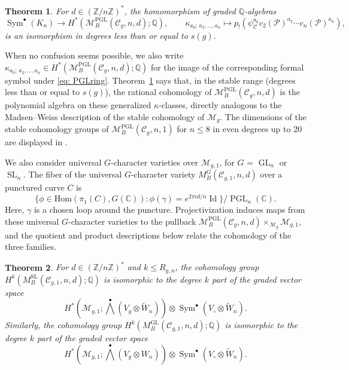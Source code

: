 \documentclass[11pt,reqno]{amsart}
\theoremstyle{plain} %
\newtheorem{theorem}{Theorem}[section]
\theoremstyle{definition}
\newcommand{\QQ}{\mathbb{Q}}
\newcommand{\CC}{\mathbb{C}}
\newcommand{\Hom}{\mathrm{Hom}}
\newcommand{\M}{\mathcal{M}}
\newcommand{\C}{\mathcal{C}}
\newcommand{\ZZ}{\mathbb{Z}}
\DeclareMathOperator{\Id}{Id}
\DeclareMathOperator{\GL}{GL}
\DeclareMathOperator{\SL}{SL}
\DeclareMathOperator{\PGL}{PGL}
\DeclareMathOperator{\Sym}{Sym}
\newcommand{\tW}{\widetilde{W}}
\begin{document}
\begin{theorem} \label{thm:stablePGL}
For $d \in (\ZZ/n\ZZ)^*$, the homomorphism of graded $\QQ$-algebras
\begin{equation}\label{eq: PGLring}
\Sym^\bullet (K_n) \longrightarrow H^*(\M_B^{\PGL}(\C_g, n,d); \QQ), \qquad \kappa_{a_0;\,a_2,\ldots,a_n} \longmapsto p_!\left(\psi_\C^{a_0}c_2(\mathcal P)^{a_2}\cdots c_n(\mathcal P)^{a_n}\right),
\end{equation}
is an isomorphism in degrees less than or equal to $s(g)$.
\end{theorem}


\noindent When no confusion seems possible, we also write $\kappa_{a_0;\,a_2,\ldots,a_n} \in H^*(\M_B^{\PGL}(\C_g, n,d); \QQ)$ for the image of the corresponding formal symbol under \eqref{eq: PGLring}. Theorem~\ref{thm:stablePGL} says that, in the stable range (degrees less than or equal to $s(g)$), the rational cohomology of $\M_B^{\PGL}(\C_g, n,d)$ is the polynomial algebra on these generalized $\kappa$-classes, directly analogous to the Madsen--Weiss description of the stable cohomology of $\M_g$. The dimensions of the stable cohomology groups of $\M_B^{\PGL}(\C_g, n, 1)$ for $n \leq 8$ in even degrees up to 20 are displayed in .



\medskip



We also consider universal $G$-character varieties over $\M_{g,1}$, for $G$ = $\GL_n$ or $\SL_n$.  The fiber of the universal $G$-character variety $M^{G}_B(\C_{g,1}, n, d)$ over a punctured curve $C$ is 
$$\{ \phi \in \Hom(\pi_1(C), G(\CC)): \phi(\gamma) = e^{2\pi i d/n} \Id\}/\PGL_n(\CC).$$
Here, $\gamma$ is a chosen loop around the puncture. Projectivization induces maps from these universal $G$-character varieties to the pullback $\M_B^{\PGL}(\C_g,n,d) \times_{\M_g} \M_{g,1}$, and the quotient and product descriptions below relate the cohomology of the three families. 


\begin{theorem}\label{thm:sl-stability-answer}
For $d \in (\ZZ/n\ZZ)^*$ and $k\leq R_{g,n}$, the cohomology group  $H^k(M^{\SL}_B(\C_{g,1}, n, d);\QQ)$ is isomorphic to the degree $k$ part of the graded vector space
    \[
H^*(\M_{g,1}; \textstyle{\bigwedge^\bullet}(V_g \otimes \tW_n)) \otimes \Sym^\bullet(V_\circ \otimes \tW_n).
    \]
    Similarly, the cohomology group  $H^k(M^{\GL}_B(\C_{g,1}, n, d);\QQ)$ is isomorphic to the degree $k$ part of the graded vector space
    \[
H^*(\M_{g,1}; \textstyle{\bigwedge^\bullet}(V_g \otimes W_n)) \otimes \Sym^\bullet(V_\circ \otimes \tW_n).
    \]
    \end{theorem}
    
\end{document}
